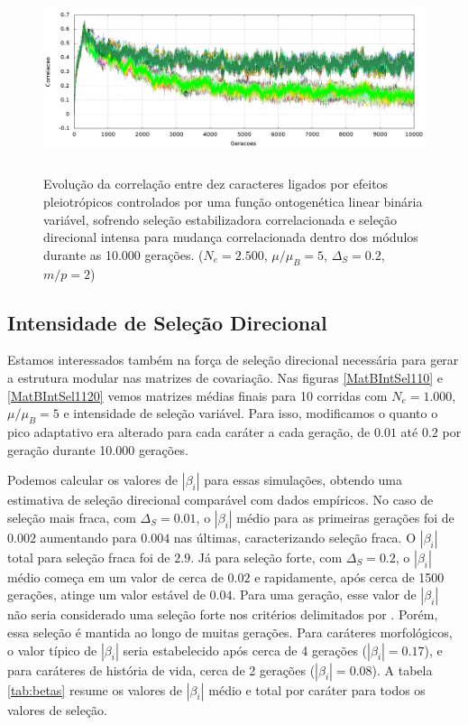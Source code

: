 \begin{figure}[htbp]
    \centering
    \includegraphics[width=150mm, height=55mm]{figuras/direcionalRMu5Ne2500IntSel200.png}
    \caption{Evolução da correlação entre dez caracteres ligados por efeitos
        pleiotrópicos controlados por uma função ontogenética linear binária
        variável, sofrendo seleção estabilizadora correlacionada
        e seleção direcional intensa para mudança correlacionada dentro dos
        módulos durante as 10.000 gerações.
    ($N_e = 2.500$, $\mu/\mu_B=5$, $\Delta_S=0.2$, $m/p=2$)}
    \label{MatBDirecionalNe2500RMu5}
\end{figure}

\subsection{Intensidade de Seleção Direcional}

Estamos interessados também na força de seleção direcional necessária
para gerar a estrutura modular nas matrizes de covariação.
Nas figuras \ref{MatBIntSel110} e \ref{MatBIntSel1120} vemos matrizes
médias finais para 10 corridas com $N_e = 1.000$, $\mu/\mu_B=5$ e
intensidade de seleção variável.
Para isso, modificamos o quanto o pico adaptativo era alterado para cada
caráter a cada geração, de $0.01$ até $0.2$ por geração durante 10.000
gerações.

Podemos calcular os valores de $|\beta_i|$ para essas simulações,
obtendo uma estimativa de seleção direcional comparável com dados
empíricos.
No caso de seleção mais fraca, com $\Delta_S = 0.01$, o $|\beta_i|$
médio para as primeiras gerações foi de $0.002$ aumentando para $0.004$
nas últimas, caracterizando seleção fraca. 
O $|\beta_i|$ total para seleção fraca foi de $2.9$.
Já para seleção forte, com $\Delta_S = 0.2$, o $|\beta_i|$ médio começa em um
valor de cerca de $0.02$ e rapidamente, após cerca de 1500 gerações,
atinge um valor estável de $0.04$. 
Para uma geração, esse valor de $|\beta_i|$ não seria considerado uma
seleção forte nos critérios delimitados por \cite{Kingsolver2001}.
Porém, essa seleção é mantida ao longo de muitas gerações.
Para caráteres morfológicos, o valor típico de $|\beta_i|$ seria
estabelecido após cerca de 4 gerações ($|\beta_i|=0.17$), e para caráteres de história de vida,
cerca de 2 gerações ($|\beta_i|=0.08$).
A tabela \ref{tab:betas} resume os valores de $|\beta_i|$ médio e total
por caráter para todos os valores de seleção.

